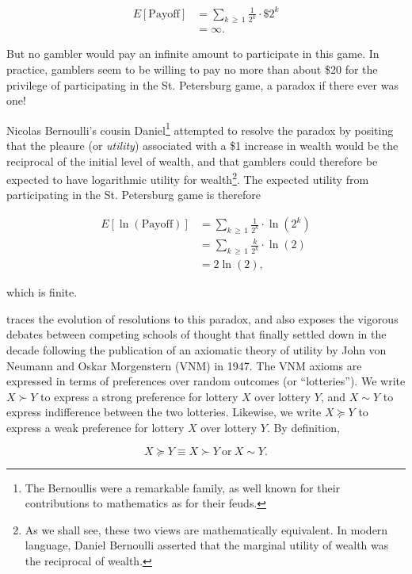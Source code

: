 \documentclass[graybox,envcountchap,sectrefs]{svmono}\usepackage[]{graphicx}\usepackage[]{xcolor}
\begin{document}
\begin{appendices}
\begin{align}
E\left[\mathrm{Payoff}\right] & =\sum_{k\,\geqslant\,1}\frac{1}{2^{k}}\cdot\$2^{k}\nonumber \\
 & =\infty.\label{eq:StPetersburgPayoff}
\end{align}

But no gambler would pay an infinite amount to participate in this
game. In practice, gamblers seem to be willing to pay no more than
about \$20 for the privilege of participating in the St. Petersburg
game, a paradox if there ever was one! 

Nicolas Bernoulli's cousin Daniel\footnote{The Bernoullis were a remarkable family, as well known for their contributions
to mathematics as for their feuds.} attempted to resolve the paradox by positing that the pleaure (or
\emph{utility}) associated with a \$1 increase in wealth would be
the reciprocal of the initial level of wealth, and that gamblers could
therefore be expected to have logarithmic utility for wealth\footnote{As we shall see, these two views are mathematically equivalent. In
modern language, Daniel Bernoulli asserted that the marginal utility
of wealth was the reciprocal of wealth.}. The expected utility from participating in the St. Petersburg game
is therefore

\begin{align}
E\left[\ln\left(\mathrm{Payoff}\right)\right] & =\sum_{k\,\geqslant\,1}\frac{1}{2^{k}}\cdot\ln\left(2^{k}\right)\nonumber \\
 & =\sum_{k\,\geqslant\,1}\frac{k}{2^{k}}\cdot\ln\left(2\right)\nonumber \\
 & =2\ln\left(2\right),\label{eq:StPetersburgUtility}
\end{align}

which is finite.

\citet{Moscati2019} traces the evolution of resolutions to this paradox,
and also exposes the vigorous debates between competing schools of
thought that finally settled down in the decade following the publication
of an axiomatic theory of utility by John von Neumann and Oskar Morgenstern
(VNM) in 1947. The VNM axioms are expressed in terms of preferences
over random outcomes (or ``lotteries''). We write $X\succ Y$ to
express a strong preference for lottery $X$ over lottery $Y$, and
$X\sim Y$ to express indifference between the two lotteries. Likewise,
we write $X\succeq Y$ to express a weak preference for lottery $X$
over lottery $Y$. By definition, 

\begin{equation}
X\succeq Y\equiv X\succ Y\ \mathrm{or}\ X\sim Y.\label{eq:XWeaklyPreferredToY}
\end{equation}


\end{appendices}
\end{document}
